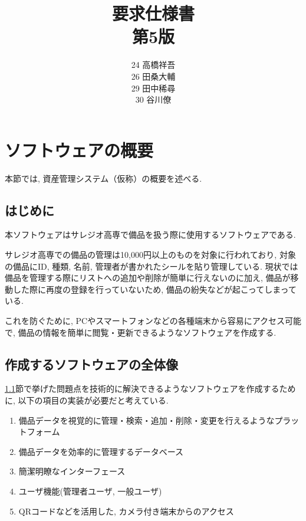 \documentclass[11ptm]{jsarticle}
\title{{\Huge 要求仕様書}\\第5版}
\author{24 高橋祥吾\\26 田桑大輔\\29 田中稀尋\\30 谷川僚}
\date{}
\begin{document}
\setcounter{page}{0}

\maketitle
\thispagestyle{empty}

\clearpage

\setcounter{page}{0}
\thispagestyle{empty}

\tableofcontents
\clearpage


\section{ソフトウェアの概要}
\label{sec:ソフトウェアの概要}
本節では, 資産管理システム（仮称）の概要を述べる.

\subsection{はじめに}
\label{subsec:はじめに}
本ソフトウェアはサレジオ高専で備品を扱う際に使用するソフトウェアである. \par
サレジオ高専での備品の管理は10,000円以上のものを対象に行われており, 対象の備品にID, 種類, 名前, 管理者が書かれたシールを貼り管理している. 現状では備品を管理する際にリストへの追加や削除が簡単に行えないのに加え, 備品が移動した際に再度の登録を行っていないため, 備品の紛失などが起こってしまっている.\par
これを防ぐために, PCやスマートフォンなどの各種端末から容易にアクセス可能で, 備品の情報を簡単に閲覧・更新できるようなソフトウェアを作成する.

\subsection{作成するソフトウェアの全体像}
\label{subsec:作成するソフトウェアの全体像}
\ref{subsec:はじめに}節で挙げた問題点を技術的に解決できるようなソフトウェアを作成するために, 以下の項目の実装が必要だと考えている.
\begin{enumerate}
  \item 備品データを視覚的に管理・検索・追加・削除・変更を行えるようなプラットフォーム
  \item 備品データを効率的に管理するデータベース
  \item 簡潔明瞭なインターフェース
  \item ユーザ機能(管理者ユーザ, 一般ユーザ)
  \item QRコードなどを活用した, カメラ付き端末からのアクセス
\end{enumerate}
\end{document}
